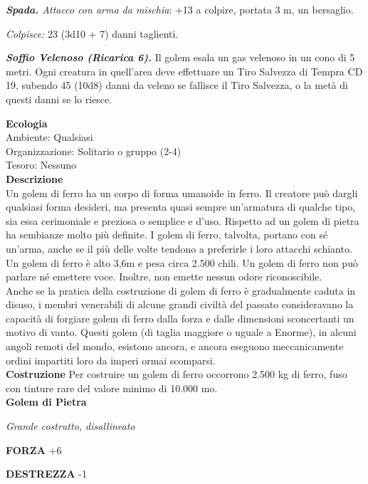 \begin{multicols}{2}
\emph{\textbf{Spada.} Attacco con arma da mischia}: +13 a colpire, portata 3 m, un bersaglio.

\emph{Colpisce:} 23 (3d10 + 7) danni taglienti.

\emph{\textbf{Soffio Velenoso (Ricarica 6).}} Il golem esala un gas velenoso in un cono di 5 metri. Ogni creatura in quell'area deve effettuare un Tiro Salvezza di Tempra CD 19, subendo 45 (10d8) danni da veleno se fallisce il Tiro Salvezza, o la metà di questi danni se lo riesce.

\textbf{Ecologia}\\
Ambiente: Qualsiasi\\
Organizzazione: Solitario o gruppo (2-4)\\
Tesoro: Nessuno\\
\textbf{Descrizione}\\
Un golem di ferro ha un corpo di forma umanoide in ferro. Il creatore può dargli qualsiasi forma desideri, ma presenta quasi sempre un'armatura di qualche tipo, sia essa cerimoniale e preziosa o semplice e d'uso. Rispetto ad un golem di pietra ha sembianze molto più definite. I golem di ferro, talvolta, portano con sé un'arma, anche se il più delle volte tendono a preferirle i loro attacchi schianto.\\

Un golem di ferro è alto 3,6m e pesa circa 2.500 chili. Un golem di ferro non può parlare né emettere voce. Inoltre, non emette nessun odore riconoscibile.\\

Anche se la pratica della costruzione di golem di ferro è gradualmente caduta in disuso, i membri venerabili di alcune grandi civiltà del passato consideravano la capacità di forgiare golem di ferro dalla forza e dalle dimensioni sconcertanti un motivo di vanto. Questi golem (di taglia maggiore o uguale a Enorme), in alcuni angoli remoti del mondo, esistono ancora, e ancora eseguono meccanicamente ordini impartiti loro da imperi ormai scomparsi.\\

\textbf{Costruzione}
Per costruire un golem di ferro occorrono 2.500 kg di ferro, fuso con tinture rare del valore minimo di 10.000 mo.\\


\medskip{}\textbf{Golem di Pietra}

\emph{Grande costrutto, disallineato}

\textbf{FORZA} +6

\textbf{DESTREZZA} -1


\end{multicols}
